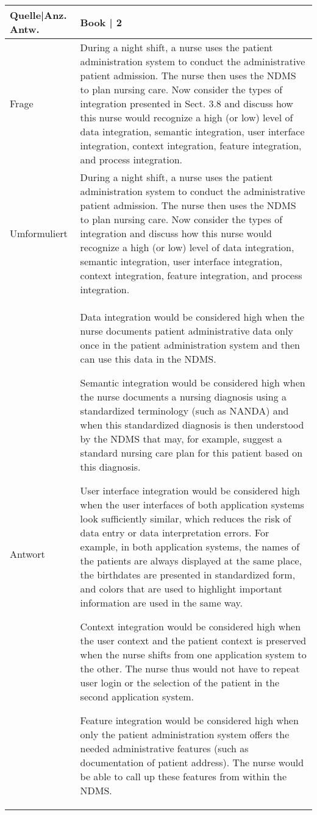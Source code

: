 {\begin{landscape}
\begin{longtable}{p{3cm}p{}}
    Quelle|Anz. Antw. &  Book  | 2 \\
    \midrule
    Frage & During a night shift, a nurse uses the patient administration system to conduct the administrative patient admission.
    The nurse then uses the NDMS to plan nursing care.
    Now consider the types of integration presented in Sect. 3.8 and discuss how this nurse would recognize a high (or low) level of data integration, semantic integration, user interface integration, context integration, feature integration, and process integration.\\
    Umformuliert & During a night shift, a nurse uses the patient administration system to conduct the administrative patient admission.
    The nurse then uses the NDMS to plan nursing care.
    Now consider the types of integration and discuss how this nurse would recognize a high (or low) level of data integration, semantic integration, user interface integration, context integration, feature integration, and process integration.\\
    Antwort & Data integration would be considered high when the nurse documents patient administrative data only once in the patient administration system and then can use this data in the NDMS.

    Semantic integration would be considered high when the nurse documents a nursing diagnosis using a standardized terminology (such as NANDA) and when this standardized diagnosis is then understood by the NDMS that may, for example, suggest a standard nursing care plan for this patient based on this diagnosis.

    User interface integration would be considered high when the user interfaces of both application systems look sufficiently similar, which reduces the risk of data entry or data interpretation errors.
    For example, in both application systems, the names of the patients are always displayed at the same place, the birthdates are presented in standardized form, and colors that are used to highlight important information are used in the same way.

    Context integration would be considered high when the user context and the patient context is preserved when the nurse shifts from one application system to the other.
    The nurse thus would not have to repeat user login or the selection of the patient in the second application system.

    Feature integration would be considered high when only the patient administration system offers the needed administrative features (such as documentation of patient address). The nurse would be able to call up these features from within the NDMS.


\end{longtable}
\end{landscape}}
